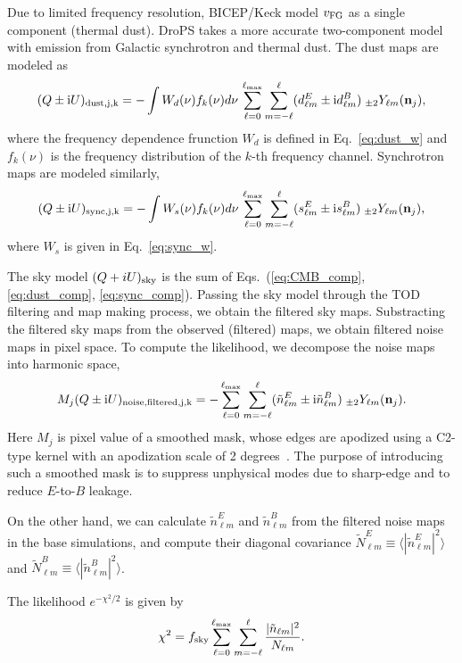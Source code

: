\documentclass[12pt, a4paper]{ctexart} %
\begin{document}
Due to limited frequency resolution, BICEP/Keck model $v_{\rm FG}$ as a single component (thermal dust). DroPS takes a more accurate two-component model with emission from Galactic synchrotron and thermal dust. The dust maps are modeled as
\begin{equation}
  (Q\pm \mathrm{i}U)_{\rm dust, j, k} =  -\int W_d(\nu) f_k(\nu) d\nu \,\sum_{\ell = 0}^{\ell_{\max}}\sum_{m=-\ell}^\ell (d_{\ell m}^E\pm \mathrm{i}  d_{\ell m}^B)\;_{\pm 2}Y_{\ell m}(\mathbf{n}_j),  \label{eq:dust_comp}
\end{equation}
where the frequency dependence frunction $W_d$ is defined in Eq.~\eqref{eq:dust_w} and $f_k(\nu)$ is the frequency distribution of the $k$-th frequency channel.
Synchrotron maps are modeled similarly,
\begin{equation}
  (Q\pm \mathrm{i}U)_{\rm sync, j, k} =  -\int W_s(\nu) f_k(\nu) d\nu \,\sum_{\ell = 0}^{\ell_{\max}}\sum_{m=-\ell}^\ell (s_{\ell m}^E\pm \mathrm{i}  s_{\ell m}^B)\;_{\pm 2}Y_{\ell m}(\mathbf{n}_j),  \label{eq:sync_comp}
\end{equation}
where $W_s$ is given in Eq.~\eqref{eq:sync_w}.

The sky model $(Q+iU)_{\rm sky}$ is the sum of Eqs.~(\ref{eq:CMB_comp}, \ref{eq:dust_comp}, \ref{eq:sync_comp}). Passing the sky model through the TOD filtering and map making process, we obtain the filtered sky maps. Substracting the filtered sky maps from the observed (filtered) maps, we obtain filtered noise maps in pixel space. To compute the likelihood, we decompose the noise maps into harmonic space,
\begin{equation}
   M_j(Q\pm \mathrm{i}U)_{\rm noise, filtered, j, k} = -\sum_{\ell = 0}^{\ell_{\max}}\sum_{m=-\ell}^\ell (\tilde{n}_{\ell m}^E\pm \mathrm{i} \tilde{n}_{\ell m}^B)\;_{\pm 2}Y_{\ell m}(\mathbf{n}_j).
\end{equation}
Here $M_j$ is pixel value of a smoothed mask, whose edges are apodized using a C2-type kernel  with an apodization scale of 2 degrees~\cite{Grain09}.  The purpose of introducing such a smoothed mask is to suppress unphysical modes due to sharp-edge and to reduce $E$-to-$B$ leakage.

On the other hand, we can calculate $\tilde{n}_{\ell m}^E$ and $\tilde{n}_{\ell m}^B$ from the filtered noise maps in the base simulations, and compute their diagonal covariance $\tilde{N}^E_{\ell m} \equiv \langle |\tilde{n}_{\ell m}^E|^2\rangle $ and $\tilde{N}^B_{\ell m} \equiv \langle |\tilde{n}_{\ell m}^B|^2\rangle $.

The likelihood $e^{-\chi^2/2}$ is given by
\begin{equation}
  \chi^2 = f_{\rm sky}\sum_{\ell = 0}^{\ell_{\max}} \sum_{m=-\ell}^\ell \frac{|\tilde{n}_{\ell m}|^2}{N_{\ell m}}.
\end{equation}





 
\end{document}
